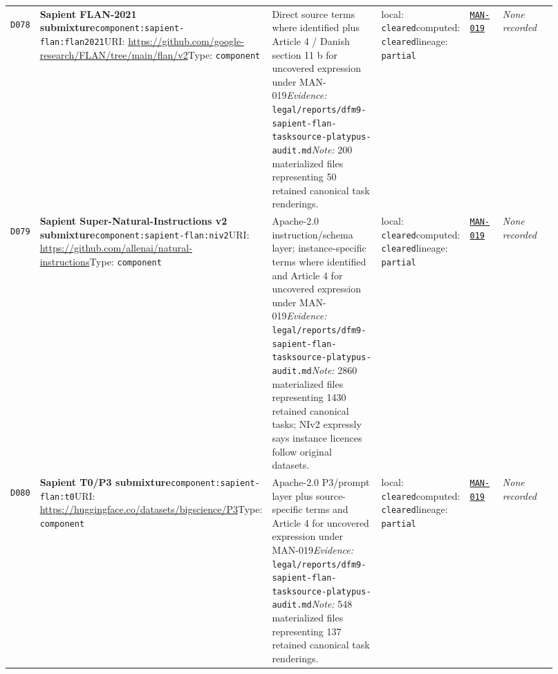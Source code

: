 \documentclass[9pt,a4paper]{article}
\newcommand{\depid}[1]{\hypertarget{dep:#1}{\texttt{#1}}}
\begin{document}
\begin{landscape}
\begin{longtable}{@{}L{0.035\linewidth}L{0.185\linewidth}L{0.27\linewidth}L{0.09\linewidth}L{0.10\linewidth}L{0.24\linewidth}@{}}
\depid{D078} & \textbf{Sapient FLAN-2021 submixture}\newline \nolinkurl{component:sapient-flan:flan2021}\newline URI: \url{https://github.com/google-research/FLAN/tree/main/flan/v2}\newline Type: \texttt{component} & Direct source terms where identified plus Article 4 / Danish section 11 b for uncovered expression under MAN-019\newline \textit{Evidence:} \nolinkurl{legal/reports/dfm9-sapient-flan-tasksource-platypus-audit.md}\newline \textit{Note:} 200 materialized files representing 50 retained canonical task renderings. & local: \texttt{cleared}\newline computed: \texttt{cleared}\newline lineage: \texttt{partial} & \hyperlink{manual:MAN-019}{\texttt{MAN-019}} & \textit{None recorded} \\
\depid{D079} & \textbf{Sapient Super-Natural-Instructions v2 submixture}\newline \nolinkurl{component:sapient-flan:niv2}\newline URI: \url{https://github.com/allenai/natural-instructions}\newline Type: \texttt{component} & Apache-2.0 instruction/schema layer; instance-specific terms where identified and Article 4 for uncovered expression under MAN-019\newline \textit{Evidence:} \nolinkurl{legal/reports/dfm9-sapient-flan-tasksource-platypus-audit.md}\newline \textit{Note:} 2860 materialized files representing 1430 retained canonical tasks; NIv2 expressly says instance licences follow original datasets. & local: \texttt{cleared}\newline computed: \texttt{cleared}\newline lineage: \texttt{partial} & \hyperlink{manual:MAN-019}{\texttt{MAN-019}} & \textit{None recorded} \\
\depid{D080} & \textbf{Sapient T0/P3 submixture}\newline \nolinkurl{component:sapient-flan:t0}\newline URI: \url{https://huggingface.co/datasets/bigscience/P3}\newline Type: \texttt{component} & Apache-2.0 P3/prompt layer plus source-specific terms and Article 4 for uncovered expression under MAN-019\newline \textit{Evidence:} \nolinkurl{legal/reports/dfm9-sapient-flan-tasksource-platypus-audit.md}\newline \textit{Note:} 548 materialized files representing 137 retained canonical task renderings. & local: \texttt{cleared}\newline computed: \texttt{cleared}\newline lineage: \texttt{partial} & \hyperlink{manual:MAN-019}{\texttt{MAN-019}} & \textit{None recorded} \\

\end{longtable}
\end{landscape}
\end{document}
